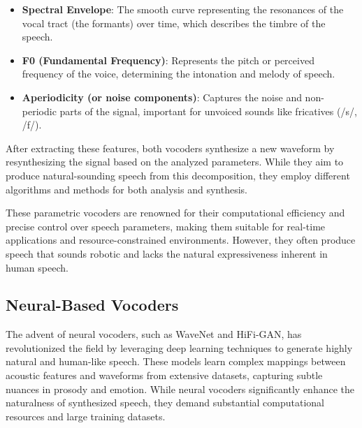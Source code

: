 \documentclass[12pt]{article}
\begin{document}
\begin{itemize}
\item \textbf{Spectral Envelope}: The smooth curve representing the resonances of the vocal tract (the formants) over time, which describes the timbre of the speech.
\item \textbf{F0 (Fundamental Frequency)}: Represents the pitch or perceived frequency of the voice, determining the intonation and melody of speech.
\item \textbf{Aperiodicity (or noise components)}: Captures the noise and non-periodic parts of the signal, important for unvoiced sounds like fricatives (/s/, /f/).
\end{itemize}

After extracting these features, both vocoders synthesize a new waveform by resynthesizing the signal based on the analyzed parameters. While they aim to produce natural-sounding speech from this decomposition, they employ different algorithms and methods for both analysis and synthesis.

These parametric vocoders are renowned for their computational efficiency and precise control over speech parameters, making them suitable for real-time applications and resource-constrained environments. However, they often produce speech that sounds robotic and lacks the natural expressiveness inherent in human speech.

\subsection{Neural-Based Vocoders}

The advent of neural vocoders, such as WaveNet and HiFi-GAN, has revolutionized the field by leveraging deep learning techniques to generate highly natural and human-like speech. These models learn complex mappings between acoustic features and waveforms from extensive datasets, capturing subtle nuances in prosody and emotion. While neural vocoders significantly enhance the naturalness of synthesized speech, they demand substantial computational resources and large training datasets.


\newpage



\end{document}
